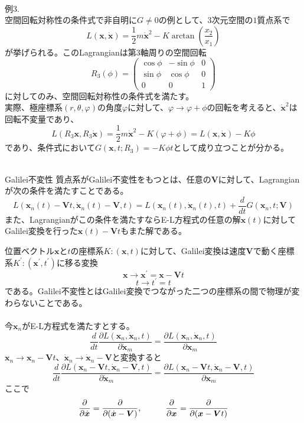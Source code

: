 \documentclass{jsarticle}
\begin{document}
\\
例3.\\
空間回転対称性の条件式で非自明に\(G\ne0\)の例として、\(3\)次元空間の\(1\)質点系で
\[L(\bm{x},\dot{\bm{x}})=\frac{1}{2}m{\dot{\bm{x}}}^{2}-K\arctan\left(\frac{x_{2}}{x_{1}}\right)\]
が挙げられる。このLagrangianは第\(3\)軸周りの空間回転
\[R_{3}(\phi)=\left(\begin{array}{ccc}
\cos\phi & -\sin\phi & 0\\
\sin\phi & \cos\phi & 0\\
0 & 0 & 1\end{array}\right)\]
に対してのみ、空間回転対称性の条件式を満たす。\\
実際、極座標系\((r,\theta,\varphi)\)の角度\(\varphi\)に対して、\(\varphi\to\varphi+\phi\)の回転を考えると、\(\dot{\bm{x}}^{2}\)は回転不変量であり、
\[L(R_{3}\bm{x},R_{3}\dot{\bm{x}})=\frac{1}{2}m\dot{\bm{x}}^{2}-K(\varphi+\phi)=L(\bm{x},\dot{\bm{x}})-K\phi\]
であり、条件式において\(\displaystyle G(\bm{x},t;R_{3})=-K\phi t\)として成り立つことが分かる。\\
\\
\begin{itembox}[l]{Galilei不変性}
質点系がGalilei不変性をもつとは、任意の\(\bm{V}\)に対して、Lagrangianが次の条件を満たすことである。
\[L(\bm{x}_{n}(t)-\bm{V}t,\dot{\bm{x}}_{n}(t)-\bm{V},t)=L(\bm{x}_{n}(t),\dot{\bm{x}}_{n}(t),t)+\frac{d}{dt}G(\bm{x}_{n},t;\bm{V})\]
また、Lagrangianがこの条件を満たすならE-L方程式の任意の解\(\bm{x}(t)\)に対してGalilei変換を行った\(\bm{x}(t)-\bm{V}t\)もまた解である。
\end{itembox}
位置ベクトル\(\bm{x}\)と\(t\)の座標系\(K:(\bm{x},t)\)に対して、Galilei変換は速度\(\bm{V}\)で動く座標系\(K^{\prime}:(\bm{x}^{\prime},t^{\prime})\)に移る変換
\[\bm{x}\to\bm{x}^{\prime}=\bm{x}-\bm{V}t\]
\[t\to t^{\prime}=t\]
である。Galilei不変性とはGalilei変換でつながった二つの座標系の間で物理が変わらないことである。\\
\\
今\(\bm{x}_{n}\)がE-L方程式を満たすとする。
\[\frac{d}{dt}\frac{\partial L(\bm{x}_{n},\dot{\bm{x}}_{n},t)}{\partial\dot{\bm{x}}_{m}}=\frac{\partial L(\bm{x}_{n},\dot{\bm{x}}_{n},t)}{\partial\bm{x}_{m}}\]
\(\bm{x}_{n}\to\bm{x}_{n}-\bm{V}t\)、\(\dot{\bm{x}}_{n}\to\dot{\bm{x}}_{n}-\bm{V}\)と変換すると
\[\frac{d}{dt}\frac{\partial L(\bm{x}_{n}-\bm{V}t,\dot{\bm{x}}_{n}-\bm{V},t)}{\partial\dot{\bm{x}}_{m}}=\frac{\partial L(\bm{x}_{n}-\bm{V}t,\dot{\bm{x}}_{n}-\bm{V},t)}{\partial\bm{x}_{m}}\]
ここで
\[\frac{\partial}{\partial\dot{\bm{x}}}=\frac{\partial}{\partial(\dot{\bm{x}}-\bm{V})},\hspace{10mm}\frac{\partial}{\partial\bm{x}}=\frac{\partial}{\partial(\bm{x}-\bm{V}t)}\]
\end{document}
